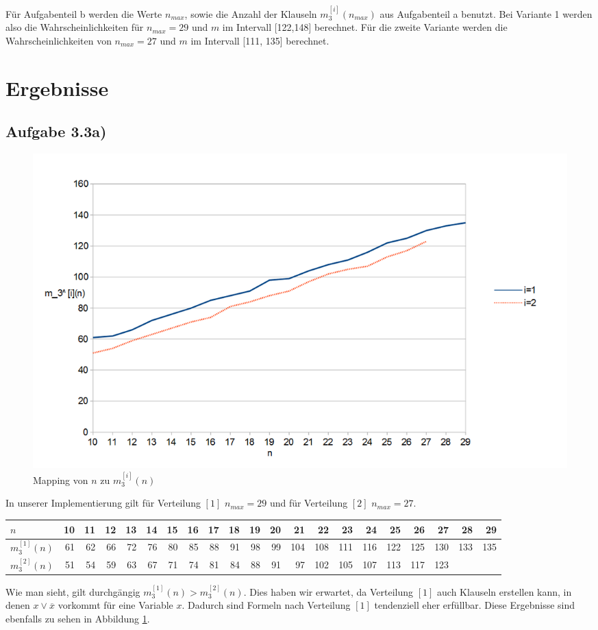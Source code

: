 \documentclass[maincolor=black]{exercise}
\newcommand{\non}[1]{\overline{#1}}
\begin{document}
Für Aufgabenteil b werden die Werte $n_{max}$, sowie die Anzahl der Klauseln $m_3^{[i]}(n_{max})$ aus Aufgabenteil a benutzt. Bei Variante 1 werden also die Wahrscheinlichkeiten für $n_{max} = 29$ und $m$ im Intervall [122,148] berechnet. Für die zweite Variante werden die Wahrscheinlichkeiten von $n_{max} = 27$ und $m$ im Intervall [111, 135] berechnet.

\section*{Ergebnisse}
\subsection{Aufgabe 3.3a)}
\begin{figure}[t]
	\includegraphics[width=\linewidth]{Diagram.png}
	\caption{Mapping von $n$ zu $m_3^{[i]}(n)$\label{fig:diagram}}
\end{figure}
In unserer Implementierung gilt für Verteilung $[1]$ $n_{max} = 29$ und für Verteilung $[2]$ $n_{max} = 27$.\\
\begin{adjustwidth}{-1cm}{}
\begin{tabular}{l|rrrrrrrrrrrrrrrrrrrr}
	$n$ & 10 & 11 & 12 & 13 & 14 & 15 & 16 & 17 & 18 & 19 & 20 & 21 & 22 & 23 & 24 & 25 & 26 & 27 & 28 & 29\\
	\midrule
	$m_3^{[1]}(n)$ & 61 & 62 & 66 & 72 & 76 & 80 & 85 & 88 & 91 & 98 & 99 & 104 & 108 & 111 & 116 & 122 & 125 & 130 & 133 & 135\\
	\midrule
	$m_3^{[2]}(n)$ & 51 & 54 & 59 & 63 & 67 & 71 & 74 & 81 & 84 & 88 & 91 & 97 & 102 & 105 & 107 & 113 & 117 & 123 & & \\
\end{tabular}
\end{adjustwidth}
\vspace{10pt}
Wie man sieht, gilt durchgängig $m_3^{[1]}(n) > m_3^{[2]}(n)$. Dies haben wir erwartet, da Verteilung $[1]$ auch Klauseln erstellen kann, in denen $x \vee \non{x}$ vorkommt für eine Variable $x$. Dadurch sind Formeln nach Verteilung $[1]$ tendenziell eher erfüllbar. Diese Ergebnisse sind ebenfalls zu sehen in Abbildung \ref{fig:diagram}.
\end{document}
